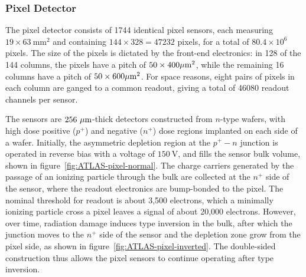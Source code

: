 \subsubsection{Pixel Detector}\label{sec:ATLAS-id-pixel-detector}

The pixel detector consists of 1744 identical pixel sensors, each measuring $19\times63~\mbox{mm}^2$ and containing $144\times 328=47232$ pixels, for a total of $80.4\times 10^6$ pixels. The size of the pixels is dictated by the front-end electronics: in 128 of the 144 columns, the pixels have a pitch of $50\times 400 \mu\mathrm{m}^2$, while the remaining 16 columns have a pitch of $50\times 600 \mu\mathrm{m}^2$. For space reasons, eight pairs of pixels in each column are ganged to a common readout, giving a total of 46080 readout channels per sensor.

 The sensors are $256~\mu\mathrm{m}$-thick detectors constructed from $n$-type wafers, with high dose positive ($p^+$) and negative ($n^+$) dose regions implanted on each side of a wafer. Initially, the asymmetric depletion region at the $p^+-n$ junction is operated in reverse bias with a voltage of $150~\mbox{V}$, and fills the sensor bulk volume, shown in figure~\ref{fig:ATLAS-pixel-normal}. The charge carriers generated by the passage of an ionizing particle through the bulk are collected at the $n^+$ side of the sensor, where the readout electronics are bump-bonded to the pixel. The nominal threshold for readout is about 3,500 electrons, which a minimally ionizing particle cross a pixel leaves a signal of about 20,000 electrons. However, over time, radiation damage induces type inversion in the bulk, after which the junction moves to the $n^+$ side of the sensor and the depletion zone grow from the pixel side, as shown in figure~\ref{fig:ATLAS-pixel-inverted}. The double-sided construction thus allows the pixel sensors to continue operating after type inversion.

